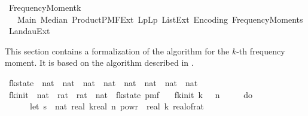 %
\begin{isabellebody}%
%
%
\isadelimdocument
%
\endisadelimdocument
%
\isatagdocument
%
\isamarkuptrue%
%
\endisatagdocument
{\isafolddocument}%
%
\isadelimdocument
%
\endisadelimdocument
%
\isadelimtheory
%
\endisadelimtheory
%
\isatagtheory
{}\isamarkupfalse%
\ Frequency{\isacharunderscore}{\kern0pt}Moment{\isacharunderscore}{\kern0pt}k\isanewline
\ \ \ Main\ Median\ Product{\isacharunderscore}{\kern0pt}PMF{\isacharunderscore}{\kern0pt}Ext\ Lp{\isachardot}{\kern0pt}Lp\ List{\isacharunderscore}{\kern0pt}Ext\ Encoding\ Frequency{\isacharunderscore}{\kern0pt}Moments\ Landau{\isacharunderscore}{\kern0pt}Ext\isanewline
{}%
\endisatagtheory
{\isafoldtheory}%
%
\isadelimtheory
%
\endisadelimtheory
%
\begin{isamarkuptext}%
This section contains a formalization of the algorithm for the $k$-th frequency moment.
It is based on the algorithm described in \cite[]{alon1999}.%
\end{isamarkuptext}\isamarkuptrue%
\isamarkupfalse%
\ fk{\isacharunderscore}{\kern0pt}state\ {\isacharequal}{\kern0pt}\ {\isachardoublequoteopen}nat\ {\isasymtimes}\ nat\ {\isasymtimes}\ nat\ {\isasymtimes}\ nat\ {\isasymtimes}\ {\isacharparenleft}{\kern0pt}nat\ {\isasymtimes}\ nat\ {\isasymRightarrow}\ {\isacharparenleft}{\kern0pt}nat\ {\isasymtimes}\ nat{\isacharparenright}{\kern0pt}{\isacharparenright}{\kern0pt}{\isachardoublequoteclose}\isanewline
\isanewline
{}\isamarkupfalse%
\ fk{\isacharunderscore}{\kern0pt}init\ {\isacharcolon}{\kern0pt}{\isacharcolon}{\kern0pt}\ {\isachardoublequoteopen}nat\ {\isasymRightarrow}\ rat\ {\isasymRightarrow}\ rat\ {\isasymRightarrow}\ nat\ {\isasymRightarrow}\ fk{\isacharunderscore}{\kern0pt}state\ pmf{\isachardoublequoteclose}\ \isanewline
\ \ {\isachardoublequoteopen}fk{\isacharunderscore}{\kern0pt}init\ k\ {\isasymdelta}\ {\isasymepsilon}\ n\ {\isacharequal}{\kern0pt}\isanewline
\ \ \ \ do\ {\isacharbraceleft}{\kern0pt}\isanewline
\ \ \ \ \ \ let\ s\ {\isacharequal}{\kern0pt}\ nat\ {\isasymlceil}{}{\isacharasterisk}{\kern0pt}real\ k{\isacharasterisk}{\kern0pt}{\isacharparenleft}{\kern0pt}real\ n{\isacharparenright}{\kern0pt}\ powr\ {\isacharparenleft}{\kern0pt}{}{\isacharminus}{\kern0pt}{}{\isacharslash}{\kern0pt}\ real\ k{\isacharparenright}{\kern0pt}{\isacharslash}{\kern0pt}\ {\isacharparenleft}{\kern0pt}real{\isacharunderscore}{\kern0pt}of{\isacharunderscore}{\kern0pt}rat\ {\isasymdelta}{\isacharparenright}{\kern0pt}\isanewline

\end{isabellebody}

